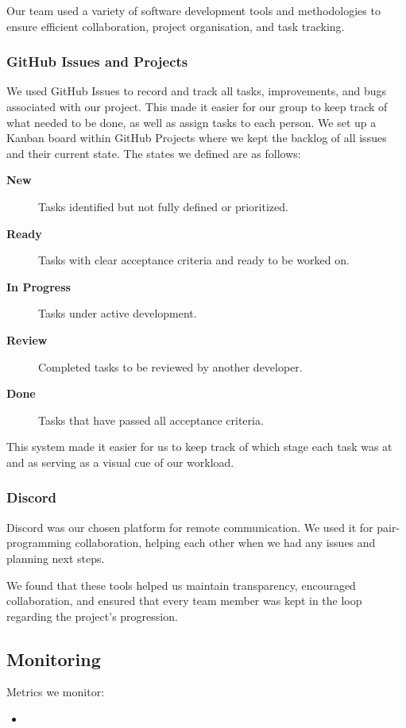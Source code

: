 Our team used a variety of software development tools and methodologies to ensure efficient collaboration, project organisation, and task tracking.

\subsubsection*{GitHub Issues and Projects}

We used GitHub Issues to record and track all tasks, improvements, and bugs associated with our project. This made it easier for our group to keep track of what needed to be done, as well as assign tasks to each person. We set up a Kanban board within GitHub Projects where we kept the backlog of all issues and their current state. The states we defined are as follows: 
\begin{description}
    \item[\textbf{New}] Tasks identified but not fully defined or prioritized.
    \item[\textbf{Ready}] Tasks with clear acceptance criteria and ready to be worked on.
    \item[\textbf{In Progress}] Tasks under active development.
    \item[\textbf{Review}] Completed tasks to be reviewed by another developer.
    \item[\textbf{Done}] Tasks that have passed all acceptance criteria.
\end{description}

This system made it easier for us to keep track of which stage each task was at and as serving as a visual cue of our workload.

\subsubsection*{Discord}

Discord was our chosen platform for remote communication. We used it for pair-programming collaboration, helping each other when we had any issues and planning next steps. 

We found that these tools helped us maintain transparency, encouraged collaboration, and ensured that every team member was kept in the loop regarding the project's progression. 

\subsection{Monitoring} \label{monitoring}
Metrics we monitor:
\begin{itemize}
    \item 
\end{itemize}

